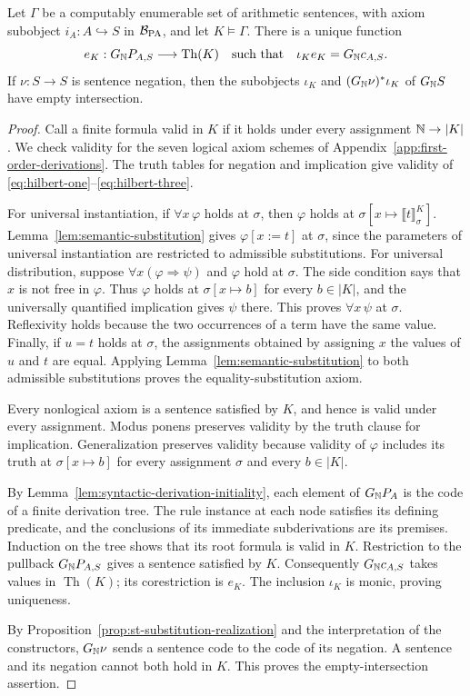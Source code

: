 \begin{proposition}
\label{prop:standard-code-soundness}
Let $\Gamma$ be a computably enumerable set of arithmetic sentences,
with axiom subobject $i_A:A\hookrightarrow S$ in
$\mathcal B_{\mathrm{PA}}$, and let $K\models\Gamma$.
There is a unique function
\[
 e_K:G_{\mathbb N}P_{A,S}\longrightarrow \operatorname{Th}(K)
 \quad\text{such that}\quad
 \iota_K e_K=G_{\mathbb N}c_{A,S}.
\]
If $\nu:S\to S$ is sentence negation, then the subobjects
$\iota_K$ and $(G_{\mathbb N}\nu)^*\iota_K$ of $G_{\mathbb N}S$ have empty
intersection.
\end{proposition}
\begin{proof}
Call a finite formula valid in $K$ if it holds under every
assignment $\mathbb N\to|K|$. We check validity for the seven logical
axiom schemes of Appendix~\ref{app:first-order-derivations}.
The truth tables for negation and implication give validity of
\eqref{eq:hilbert-one}--\eqref{eq:hilbert-three}.

For universal instantiation, if $\forall x\,\varphi$ holds at
$\sigma$, then $\varphi$ holds at
$\sigma[x\mapsto\llbracket t\rrbracket^K_\sigma]$.
Lemma~\ref{lem:semantic-substitution} gives
$\varphi[x:=t]$ at $\sigma$, since the parameters of universal
instantiation are restricted to admissible substitutions.
For universal distribution, suppose
$\forall x(\varphi\Rightarrow\psi)$ and $\varphi$ hold at
$\sigma$. The side condition says that $x$ is not free in
$\varphi$. Thus $\varphi$ holds at $\sigma[x\mapsto b]$ for
every $b\in|K|$, and the universally quantified implication gives
$\psi$ there. This proves $\forall x\,\psi$ at $\sigma$.
Reflexivity holds because the two occurrences of a term have the
same value. Finally, if $u=t$ holds at $\sigma$, the assignments
obtained by assigning $x$ the values of $u$ and $t$ are equal.
Applying Lemma~\ref{lem:semantic-substitution} to both admissible
substitutions proves the equality-substitution axiom.

Every nonlogical axiom is a sentence satisfied by $K$, and hence
is valid under every assignment. Modus ponens preserves validity
by the truth clause for implication. Generalization preserves
validity because validity of $\varphi$ includes its truth at
$\sigma[x\mapsto b]$ for every assignment $\sigma$ and every
$b\in|K|$.

By Lemma~\ref{lem:syntactic-derivation-initiality}, each element
of $G_{\mathbb N}P_A$ is the code of a finite derivation tree. The
rule instance at each node satisfies its defining predicate, and
the conclusions of its immediate subderivations are its premises.
Induction on the tree shows that its root
formula is valid in $K$. Restriction to the pullback
$G_{\mathbb N}P_{A,S}$ gives a sentence satisfied by $K$.
Consequently $G_{\mathbb N}c_{A,S}$ takes values in $\operatorname{Th}(K)$; its
corestriction is $e_K$. The inclusion $\iota_K$ is monic, proving
uniqueness.

By Proposition~\ref{prop:st-substitution-realization} and the
interpretation of the constructors, $G_{\mathbb N}\nu$ sends a sentence code to
the code of its negation. A sentence and its negation cannot
both hold in $K$. This proves the empty-intersection assertion.
\end{proof}

